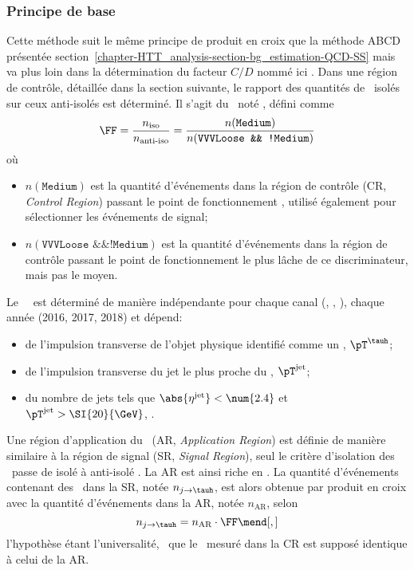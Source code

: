 \subsubsection{Principe de base}
Cette méthode suit le même principe de produit en croix que la méthode \og ABCD \fg{} présentée section~\ref{chapter-HTT_analysis-section-bg_estimation-QCD-SS} mais va plus loin dans la détermination du facteur $C/D$ nommé ici \fakefactor.
Dans une région de contrôle, détaillée dans la section suivante, le rapport des quantités de \tauh\ isolés sur ceux anti-isolés est déterminé.
Il s'agit du \fakefactor\, noté \FF, défini comme
\begin{equation}
\FF = \frac{n_\text{iso}}{n_\text{anti-iso}} = \frac{n(\texttt{Medium})}{n(\texttt{VVVLoose \&\& !Medium})}
\label{eq-chapter-HTT_analysis-section-bg_estimation-FF_method-FF_def_global}
\end{equation}
où
\begin{itemize}
\item $n(\texttt{Medium})$ est la quantité d'événements dans la région de contrôle (CR, \emph{Control Region}) passant le point de fonctionnement , utilisé également pour sélectionner les événements de signal;
\item $n(\texttt{VVVLoose \&\& !Medium})$ est la quantité d'événements dans la région de contrôle passant le point de fonctionnement le plus lâche de ce discriminateur, mais pas le moyen.
\end{itemize}
Le \fakefactor\ \FF\ est déterminé de manière indépendante pour chaque canal (\tauh\tauh, \mu\tauh, \ele\tauh), chaque année (2016, 2017, 2018) et dépend:
\begin{itemize}
\item de l'impulsion transverse de l'objet physique identifié comme un \tauh, $\pT^{\tauh}$;
\item de l'impulsion transverse du jet le plus proche du \tauh, $\pT^\text{jet}$;
\item du nombre de jets tels que $\abs{\eta^\text{jet}}<\num{2.4}$ et $\pT^\text{jet}>\SI{20}{\GeV}$, \Nprebjets.
\end{itemize}
\par
Une région d'application du \fakefactor\ (AR, \emph{Application Region}) est définie de manière similaire à la région de signal (SR, \emph{Signal Region}), seul le critère d'isolation des \tauh\ passe de \og isolé \fg{}  à \og anti-isolé \fg.
La AR est ainsi riche en \ftauhs.
La quantité d'événements contenant des \ftauhs\ dans la SR, notée $n_{j\to\tauh}$, est alors obtenue par produit en croix avec la quantité d'événements dans la AR, notée $n_\text{AR}$,  selon
\begin{equation}
n_{j\to\tauh} = n_\text{AR} \cdot \FF
\mend[,]
\end{equation}
l'hypothèse étant l'universalité, \ie\ que le \fakefactor\ mesuré dans la CR est supposé identique à celui de la AR.
